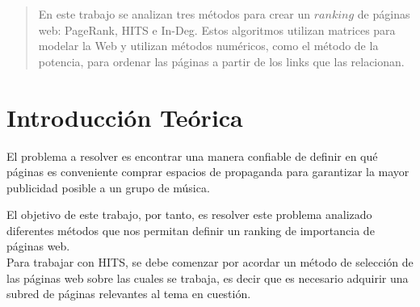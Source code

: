 \documentclass[a4paper]{article}
\begin{document}
\thispagestyle{empty}

\maketitle
\newpage

\thispagestyle{empty}
\vfill
\begin{abstract}
En este trabajo se analizan tres métodos para crear un $ranking$ de páginas web: PageRank, HITS e In-Deg. Estos algoritmos utilizan matrices para modelar la Web y utilizan métodos numéricos, como el método de la potencia, para ordenar las páginas a partir de los links que las relacionan. %
\end{abstract}

\thispagestyle{empty}
\vspace{3cm}
\tableofcontents
\newpage


\newpage

\section{Introducci\'{o}n Te\'{o}rica}
\label{sec:intro}

El problema a resolver es encontrar una manera confiable de definir en qué páginas es conveniente comprar espacios de propaganda para garantizar la mayor publicidad posible a un grupo de música.

El objetivo de este trabajo, por tanto, es resolver este problema analizado diferentes métodos que nos permitan definir un ranking de importancia de p\'{a}ginas web. \\

Para trabajar con HITS, se debe comenzar por acordar un m\'{e}todo de selecci\'{o}n de las p\'{a}ginas web sobre las cuales se trabaja, es decir que es necesario adquirir una subred de p\'{a}ginas relevantes al tema en cuesti\'{o}n.
\end{document}
